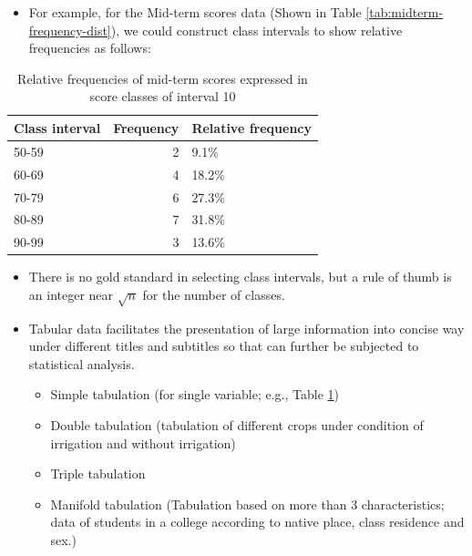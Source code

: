 \documentclass[
  ignorenonframetext,
  aspectratio=169]{beamer}
\providecommand{\tightlist}{%
  \setlength{\itemsep}{0pt}\setlength{\parskip}{0pt}}
\begin{document}
\begin{frame}{}
\protect\hypertarget{section-4}{}
\begin{itemize}
\tightlist
\item
  For example, for the Mid-term scores data (Shown in Table
  \ref{tab:midterm-frequency-dist}), we could construct class intervals
  to show relative frequencies as follows:
\end{itemize}

\begin{table}

\caption{\label{tab:midterm-frequency-class-tab}Relative frequencies of mid-term scores expressed in score classes of interval 10}
\centering
\begin{tabular}[t]{lrl}
\toprule
Class interval & Frequency & Relative frequency\\
\midrule
50-59 & 2 & 9.1\%\\
60-69 & 4 & 18.2\%\\
70-79 & 6 & 27.3\%\\
80-89 & 7 & 31.8\%\\
90-99 & 3 & 13.6\%\\
\bottomrule
\end{tabular}
\end{table}

\begin{itemize}
\tightlist
\item
  There is no gold standard in selecting class intervals, but a rule of
  thumb is an integer near \(\sqrt n\) for the number of classes.
\end{itemize}
\end{frame}

\begin{frame}{}
\protect\hypertarget{section-5}{}
\begin{itemize}
\tightlist
\item
  Tabular data facilitates the presentation of large information into
  concise way under different titles and subtitles so that can further
  be subjected to statistical analysis.

  \begin{itemize}
  \tightlist
  \item
    Simple tabulation (for single variable; e.g., Table
    \ref{tab:midterm-frequency-class-tab})
  \item
    Double tabulation (tabulation of different crops under condition of
    irrigation and without irrigation)
  \item
    Triple tabulation
  \item
    Manifold tabulation (Tabulation based on more than 3
    characteristics; data of students in a college according to native
    place, class residence and sex.)
  \end{itemize}
\end{itemize}
\end{frame}
\end{document}
